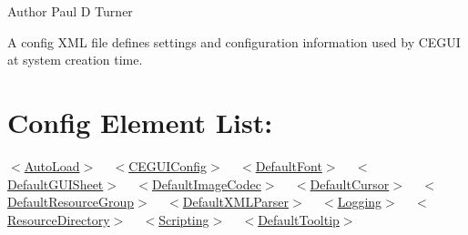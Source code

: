 \begin{DoxyAuthor}{Author}
Paul D Turner
\end{DoxyAuthor}
A config X\+ML file defines settings and configuration information used by C\+E\+G\+UI at system creation time.\hypertarget{xml_config_xml_config_contents}{}\section{Config Element List\+:}\label{xml_config_xml_config_contents}
\mbox{\hyperlink{xml_config_xml_config_autoload}{$<$\+Auto\+Load$>$}} ~\newline
 \mbox{\hyperlink{xml_config_xml_config_ceguiconfig}{$<$\+C\+E\+G\+U\+I\+Config$>$}} ~\newline
 \mbox{\hyperlink{xml_config_xml_config_font}{$<$\+Default\+Font$>$}} ~\newline
 \mbox{\hyperlink{xml_config_xml_config_guisheet}{$<$\+Default\+G\+U\+I\+Sheet$>$}} ~\newline
 \mbox{\hyperlink{xml_config_xml_config_imagecodec}{$<$\+Default\+Image\+Codec$>$}} ~\newline
 \mbox{\hyperlink{xml_config_xml_config_cursor}{$<$\+Default\+Cursor$>$}} ~\newline
 \mbox{\hyperlink{xml_config_xml_config_defaultresourcegroup}{$<$\+Default\+Resource\+Group$>$}} ~\newline
 \mbox{\hyperlink{xml_config_xml_config_xmlparser}{$<$\+Default\+X\+M\+L\+Parser$>$}} ~\newline
 \mbox{\hyperlink{xml_config_xml_config_logging}{$<$\+Logging$>$}} ~\newline
 \mbox{\hyperlink{xml_config_xml_config_resourcedirectory}{$<$\+Resource\+Directory$>$}} ~\newline
 \mbox{\hyperlink{xml_config_xml_config_scripting}{$<$\+Scripting$>$}} ~\newline
 \mbox{\hyperlink{xml_config_xml_config_tooltip}{$<$\+Default\+Tooltip$>$}} ~\newline


